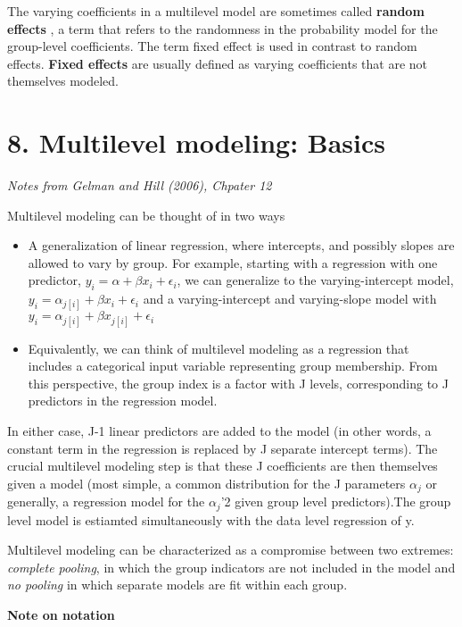 \documentclass[12pt,]{article}
\begin{document}
The varying coefficients in a multilevel model are sometimes called
\textbf{random effects} , a term that refers to the randomness in the
probability model for the group-level coefficients. The term fixed
effect is used in contrast to random effects. \textbf{Fixed effects} are
usually defined as varying coefficients that are not themselves modeled.

\section{8. Multilevel modeling:
Basics}\label{multilevel-modeling-basics}

\emph{Notes from Gelman and Hill (2006), Chpater 12}

Multilevel modeling can be thought of in two ways

\begin{itemize}
\item{A generalization of linear regression, where intercepts, and possibly slopes are allowed to vary by group. For example, starting with a regression with one predictor, $y_i = \alpha + \beta x_i + \epsilon_i$, we can generalize to the varying-intercept model, $y_i = \alpha_{j[i]} + \beta x_{i} + \epsilon_i$ and a varying-intercept and varying-slope model with $y_i = \alpha_{j[i]} + \beta x_{j[i]} + \epsilon_i$}
\item{Equivalently, we can think of multilevel modeling as a regression that includes a categorical input variable representing group membership. From this perspective, the group index is a factor with J levels, corresponding to J predictors in the regression model.}
\end{itemize}

In either case, J-1 linear predictors are added to the model (in other
words, a constant term in the regression is replaced by J separate
intercept terms). The crucial multilevel modeling step is that these J
coefficients are then themselves given a model (most simple, a common
distribution for the J parameters \(\alpha_j\) or generally, a
regression model for the \(\alpha_j\)'2 given group level
predictors).The group level model is estiamted simultaneously with the
data level regression of y.

Multilevel modeling can be characterized as a compromise between two
extremes: \emph{complete pooling}, in which the group indicators are not
included in the model and \emph{no pooling} in which separate models are
fit within each group.

\textbf{Note on notation}
\end{document}
